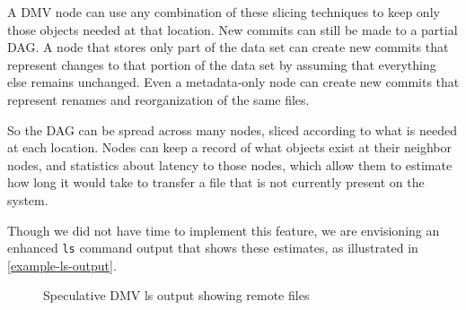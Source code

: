 
A DMV node can use any combination of these slicing techniques to keep only
those objects needed at that location. New commits can still be made to a
partial DAG. A node that stores only part of the data set can create new commits
that represent changes to that portion of the data set by assuming that
everything else remains unchanged. Even a metadata-only node can create new
commits that represent renames and reorganization of the same files.

So the DAG can be spread across many nodes, sliced according to what is needed
at each location. Nodes can keep a record of what objects exist at their
neighbor nodes, and statistics about latency to those nodes, which allow them to
estimate how long it would take to transfer a file that is not currently present
on the system.

Though we did not have time to implement this feature, we are envisioning an
enhanced \lstinline{ls} command output that shows these estimates, as
illustrated in \autoref{example-ls-output}.

\begin{figure}[]
    \caption{Speculative DMV ls output showing remote files}
    \label{example-ls-output}
    
\end{figure}


%
